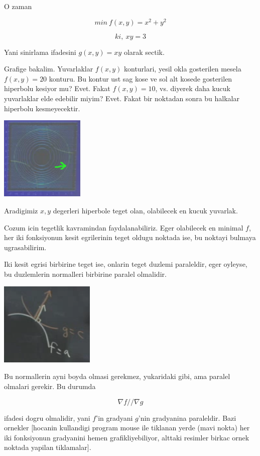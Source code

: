 \documentclass[12pt,fleqn]{article}\usepackage{../common}
\begin{document}
O zaman

\[ min \ f(x,y) = x^2 + y^2 \]

\[ ki, \ xy = 3  \]

Yani sinirlama ifadesini $g(x,y) = xy$ olarak sectik. 

Grafige bakalim. Yuvarlaklar $f(x,y)$ konturlari, yesil okla gosterilen
mesela $f(x,y) = 20$ konturu. Bu kontur ust sag kose ve sol alt kosede
gosterilen hiperbolu kesiyor mu? Evet. Fakat $f(x,y) = 10$, vs. diyerek
daha kucuk yuvarlaklar elde edebilir miyim? Evet. Fakat bir noktadan sonra
bu halkalar hiperbolu kesmeyecektir. 

\includegraphics[height=4cm]{13_2.png}

Aradigimiz $x,y$ degerleri hiperbole teget olan, olabilecek en kucuk
yuvarlak.

Cozum icin tegetlik kavramindan faydalanabiliriz. Eger olabilecek en
minimal $f$, her iki fonksiyonun kesit egrilerinin teget oldugu noktada
ise, bu noktayi bulmaya ugrasabilirim. 

Iki kesit egrisi birbirine teget ise, onlarin teget duzlemi paraleldir,
eger oyleyse, bu duzlemlerin normalleri birbirine paralel olmalidir. 

\includegraphics[height=4cm]{13_3.png}

Bu normallerin ayni boyda olmasi gerekmez, yukaridaki gibi, ama paralel
olmalari gerekir. Bu durumda 

\[ \nabla f // \nabla g \]

ifadesi dogru olmalidir, yani $f$'in gradyani $g$'nin gradyanina
paraleldir. Bazi ornekler [hocanin kullandigi program mouse ile tiklanan
yerde (mavi nokta) her iki fonksiyonun gradyanini hemen grafikliyebiliyor,
alttaki resimler birkac ornek noktada yapilan tiklamalar]. 
\end{document}
